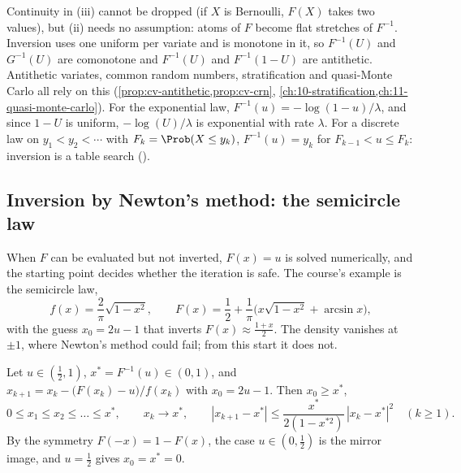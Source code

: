 Continuity in (iii) cannot be dropped (if $X$ is Bernoulli, $F(X)$ takes two values), but
(ii) needs no assumption: atoms of $F$ become flat stretches of $F^{-1}$. Inversion uses one
uniform per variate and is monotone in it, so $F^{-1}(U)$ and $G^{-1}(U)$ are comonotone and $F^{-1}(U)$ and
$F^{-1}(1-U)$ are antithetic. Antithetic variates, common random numbers, stratification and
quasi-Monte Carlo all rely on this (\cref{prop:cv-antithetic,prop:cv-crn},
\cref{ch:10-stratification,ch:11-quasi-monte-carlo}). For the exponential law,
$F^{-1}(u)=-\log(1-u)/\lambda$, and since $1-U$ is uniform, $-\log(U)/\lambda$ is exponential
with rate $\lambda$. For a discrete law on $y_1<y_2<\cdots$ with $F_k=\Prob(X\le y_k)$,
$F^{-1}(u)=y_k$ for $F_{k-1}<u\le F_k$: inversion is a table search
().

\subsection{Inversion by Newton's method: the semicircle law}

When $F$ can be evaluated but not inverted, $F(x)=u$ is solved numerically, and the starting
point decides whether the iteration is safe. The course's example is the semicircle law,
\[
  f(x)=\frac2\pi\sqrt{1-x^2},\qquad F(x)=\frac12+\frac1\pi\Big(x\sqrt{1-x^2}+\arcsin x\Big),
\]
with the guess $x_0=2u-1$ that inverts $F(x)\approx\frac{1+x}2$. The density vanishes at
$\pm1$, where Newton's method could fail; from this start it does not.

\begin{proposition}\label{prop:rng-semicircle-newton}
Let $u\in(\frac12,1)$, $x^*=F^{-1}(u)\in(0,1)$, and
$x_{k+1}=x_k-\big(F(x_k)-u\big)/f(x_k)$ with $x_0=2u-1$. Then $x_0\ge x^*$,
\[
  0\le x_1\le x_2\le\dots\le x^*,\qquad x_k\to x^*,\qquad
  |x_{k+1}-x^*|\le\frac{x^*}{2(1-x^{*2})}\,|x_k-x^*|^2\quad(k\ge1).
\]
By the symmetry $F(-x)=1-F(x)$, the case $u\in(0,\frac12)$ is the mirror image, and $u=\frac12$
gives $x_0=x^*=0$.
\end{proposition}


